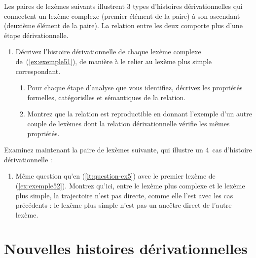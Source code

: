 Les paires de lexèmes suivants illustrent 3 types d'histoires dérivationnelles qui connectent un lexème complexe  (premier élément de la paire) à son ascendant (deuxième élément de la paire). La relation entre les deux comporte plus d'une étape dérivationnelle. 

\begin{exe}
  \ex \label{ex:exemple51}\begin{xlist}
    \ex \excinqcogestionnaire
    \ex \excinqpoulailler
    \ex \excinqlangagier
  \end{xlist}
\end{exe}

\begin{enumerate}
\item \label{it:question-ex5} Décrivez l'histoire dérivationnelle de chaque lexème complexe de~(\ref{ex:exemple51}), de manière à le relier au lexème plus simple correspondant.  
  \begin{enumerate}
  \item Pour chaque étape d'analyse que vous identifiez, décrivez les propriétés formelles, catégorislles et sémantiques de la relation.
  \item Montrez que la relation est reproductible en donnant l'exemple d'un autre couple de lexèmes dont la relation dérivationnelle vérifie les mêmes propriétés.
  \end{enumerate}
\end{enumerate}

Examinez maintenant la paire de lexèmes suivante, qui illustre un 4\ieme\ cas d'histoire dérivationnelle :

\begin{exe} 
  \ex \label{ex:exemple52} \excinqbitumisation
\end{exe}

\begin{enumerate}
\item Même question qu'en (\ref{it:question-ex5}) avec le premier lexème de (\ref{ex:exemple52}).  Montrez qu'ici, entre le lexème plus complexe et le lexème plus simple, la trajectoire n'est pas directe, comme elle l'est avec les cas précédents : le lexème plus simple n'est pas un ancêtre direct de l'autre lexème.
\end{enumerate}

\section{Nouvelles histoires dérivationnelles}

